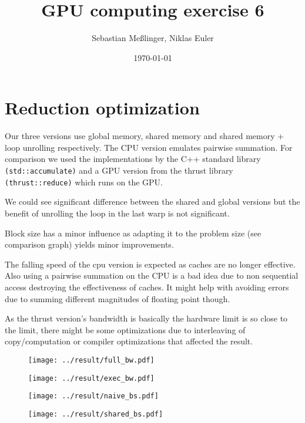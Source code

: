 \documentclass[11pt,twoside,a4paper]{scrartcl}
\title{GPU computing exercise 6}
\date{\today}
\author{Sebastian Meßlinger, Niklas Euler}
\begin{document}
\maketitle



\section{Reduction optimization}

Our three versions use global memory, shared memory and shared memory + loop unrolling respectively.
The CPU version emulates pairwise summation. For comparison we used the implementations by the C++ standard library \texttt{(std::accumulate)} and a GPU version from the thrust library \texttt{(thrust::reduce)} which runs on the GPU.

We could see significant difference between the shared and global versions but the benefit of unrolling the loop in the last warp is not significant.

Block size has a minor influence as adapting it to the problem size (see comparison graph) yields minor improvements.

The falling speed of the cpu version is expected as caches are no longer effective. Also using a pairwise summation on the CPU is a bad idea due to non sequential access destroying the effectiveness of caches. It might help with avoiding errors due to summing different magnitudes of floating point though.

As the thrust version's bandwidth is basically the hardware limit is so close to the limit, there might be some optimizations due to interleaving of copy/computation or compiler optimizations that affected the result.

\begin{figure}
    \centering
    \texttt{[image: ../result/full\_bw.pdf]}
\end{figure}
\begin{figure}
    \texttt{[image: ../result/exec\_bw.pdf]}
\end{figure}
\begin{figure}
    \texttt{[image: ../result/naive\_bs.pdf]}
\end{figure}
\begin{figure}
    \texttt{[image: ../result/shared\_bs.pdf]}
\end{figure}
\end{document}
